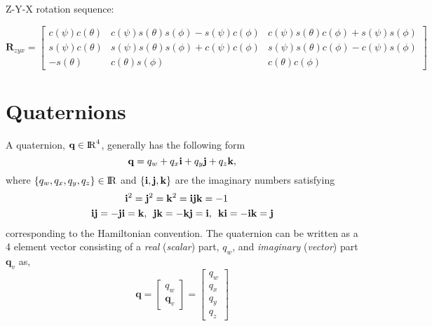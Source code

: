 \documentclass{article}
\newcommand{\real}{{\rm I\!R}}
\renewcommand{\Vec}[1]{\mathbf{#1}}
\newcommand{\Mat}[1]{\mathbf{#1}}
\newcommand{\rot}{\Mat{R}}
\newcommand{\quat}{\Vec{q}}
\newcommand{\rot}{{\Mat{R}}}
\begin{document}
Z-Y-X rotation sequence:

\begin{equation}
  \rot_{zyx} =
  \begin{bmatrix}
    c(\psi) c(\theta)
    & c(\psi) s(\theta) s(\phi) - s(\psi) c(\phi)
    & c(\psi) s(\theta) c(\phi) + s(\psi) s(\phi) \\
    s(\psi) c(\theta)
    & s(\psi) s(\theta) s(\phi) + c(\psi) c(\phi)
    & s(\psi) s(\theta) c(\phi) - c(\psi) s(\phi) \\
    -s(\theta) & c(\theta) s(\phi) & c(\theta) c(\phi)
  \end{bmatrix}
\end{equation}



\section{Quaternions}

A quaternion, $\Vec{q} \in \real^{4}$, generally has the following form
%
\begin{equation}
  \quat = q_{w} + q_{x} \bold{i} + q_{y} \bold{j} + q_{z} \bold{k},
\end{equation}
%
where $\{ q_{w}, q_{x}, q_{y}, q_{z} \} \in \real$ and $\{ \bold{i}, \bold{j},
\bold{k} \}$ are the imaginary numbers satisfying
%
\begin{equation}
\begin{split}
  &\bold{i}^{2}
  = \bold{j}^{2}
  = \bold{k}^{2}
  = \bold{ijk}
  = -1 \\
  \bold{ij} = -\bold{ji} &= \bold{k}, \enspace
  \bold{jk} = -\bold{kj} = \bold{i}, \enspace
  \bold{ki} = -\bold{ik} = \bold{j}
\end{split}
\end{equation}
%
corresponding to the Hamiltonian convention. The quaternion can be written as a
4 element vector consisting of a \textit{real} (\textit{scalar}) part, $q_{w}$,
and \textit{imaginary} (\textit{vector}) part $\quat_{v}$ as,
%
\begin{equation}
  \quat =
  \begin{bmatrix} q_{w} \\ \quat_{v} \end{bmatrix} =
  \begin{bmatrix} q_{w} \\ q_{x} \\ q_{y} \\ q_{z} \end{bmatrix}
\end{equation}
%
\end{document}
